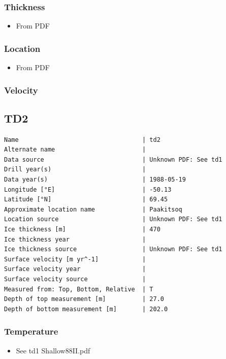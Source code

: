\documentclass[article,a4paper,times,11pt,twoside]{article}
\begin{document}
\subsubsection{Thickness}
\label{sec:orgddad157}

\begin{itemize}
\item From PDF
\end{itemize}

\subsubsection{Location}
\label{sec:orgc28a3a4}

\begin{itemize}
\item From PDF
\end{itemize}

\subsubsection{Velocity}
\label{sec:orga16a813}
\clearpage
\subsection{TD2}
\label{sec:org1c8ccec}
\begin{verbatim}
Name                                  | td2
Alternate name                        | 
Data source                           | Unknown PDF: See td1
Drill year(s)                         | 
Data year(s)                          | 1988-05-19
Longitude [°E]                        | -50.13
Latitude [°N]                         | 69.45
Approximate location name             | Paakitsoq
Location source                       | Unknown PDF: See td1
Ice thickness [m]                     | 470
Ice thickness year                    | 
Ice thickness source                  | Unknown PDF: See td1
Surface velocity [m yr^-1]            | 
Surface velocity year                 | 
Surface velocity source               | 
Measured from: Top, Bottom, Relative  | T
Depth of top measurement [m]          | 27.0
Depth of bottom measurement [m]       | 202.0
\end{verbatim}

\subsubsection{Temperature}
\label{sec:org45705e6}

\begin{itemize}
\item See td1 Shallow88II.pdf
\end{itemize}
\end{document}
